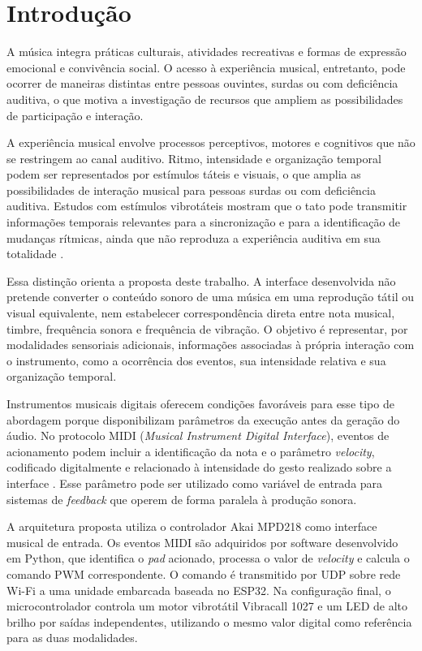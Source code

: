 \chapter{Introdução}

A música integra práticas culturais, atividades recreativas e formas de expressão emocional e convivência social. O acesso à experiência musical, entretanto, pode ocorrer de maneiras distintas entre pessoas ouvintes, surdas ou com deficiência auditiva, o que motiva a investigação de recursos que ampliem as possibilidades de participação e interação.

A experiência musical envolve processos perceptivos, motores e cognitivos que não se restringem ao canal auditivo. Ritmo, intensidade e organização temporal podem ser representados por estímulos táteis e visuais, o que amplia as possibilidades de interação musical para pessoas surdas ou com deficiência auditiva. Estudos com estímulos vibrotáteis mostram que o tato pode transmitir informações temporais relevantes para a sincronização e para a identificação de mudanças rítmicas, ainda que não reproduza a experiência auditiva em sua totalidade \cite{darrowgoll1989,tranchant2017,fletcher2021}.

Essa distinção orienta a proposta deste trabalho. A interface desenvolvida não pretende converter o conteúdo sonoro de uma música em uma reprodução tátil ou visual equivalente, nem estabelecer correspondência direta entre nota musical, timbre, frequência sonora e frequência de vibração. O objetivo é representar, por modalidades sensoriais adicionais, informações associadas à própria interação com o instrumento, como a ocorrência dos eventos, sua intensidade relativa e sua organização temporal.

Instrumentos musicais digitais oferecem condições favoráveis para esse tipo de abordagem porque disponibilizam parâmetros da execução antes da geração do áudio. No protocolo MIDI (\textit{Musical Instrument Digital Interface}), eventos de acionamento podem incluir a identificação da nota e o parâmetro \textit{velocity}, codificado digitalmente e relacionado à intensidade do gesto realizado sobre a interface \cite{midi1996}. Esse parâmetro pode ser utilizado como variável de entrada para sistemas de \textit{feedback} que operem de forma paralela à produção sonora.

A arquitetura proposta utiliza o controlador Akai MPD218 como interface musical de entrada. Os eventos MIDI são adquiridos por software desenvolvido em Python, que identifica o \textit{pad} acionado, processa o valor de \textit{velocity} e calcula o comando PWM correspondente. O comando é transmitido por UDP sobre rede Wi-Fi a uma unidade embarcada baseada no ESP32. Na configuração final, o microcontrolador controla um motor vibrotátil Vibracall 1027 e um LED de alto brilho por saídas independentes, utilizando o mesmo valor digital como referência para as duas modalidades.

